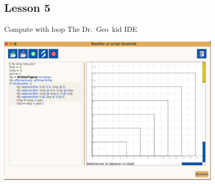 \documentclass{beamer}
\newcommand{\drgeo}{Dr.~Geo}
\begin{document}
\subsection{Lesson 5}
\begin{frame}{Compute with loop}
  The \drgeo\ kid IDE
  \begin{center}
    \includegraphics[width=0.8\textwidth]{drgeoKidIDE.png}
  \end{center}
\end{frame}
\end{document}
